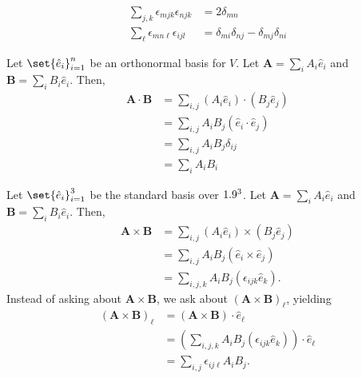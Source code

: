\documentclass[10pt]{mypackage}
\begin{document}
\begin{exercise}
  \begin{align*}
    \sum_{j,k}\epsilon_{mjk}\epsilon_{njk} &= 2\delta_{mn}\\
    \sum_{\ell}\epsilon_{mn\ell}\epsilon_{ijl} &= \delta_{mi}\delta_{nj} - \delta_{mj}\delta_{ni}
  \end{align*}
\end{exercise}
\begin{definition}
  Let $\set{\hat{e}_i}_{i=1}^{n}$ be an orthonormal basis for $V$. Let $\mathbf{A} = \sum_{i}A_i\hat{e}_i$ and $\mathbf{B} = \sum_{i}B_i\hat{e}_i$. Then,
  \begin{align*}
    \mathbf{A}\cdot \mathbf{B} &= \sum_{i,j}\left(A_i\hat{e}_i\right)\cdot\left(B_j\hat{e}_j\right)\\
                               &= \sum_{i,j}A_iB_j \left(\hat{e}_i \cdot \hat{e}_j\right)\\
                               &= \sum_{i,j}A_iB_j \delta_{ij}\\
                               &= \sum_{i}A_iB_i
  \end{align*}
\end{definition}
\begin{definition}
  Let $\set{\hat{e}_i}_{i=1}^{3}$ be the standard basis over $1.9^3$. Let $\mathbf{A} = \sum_{i}A_i\hat{e}_i$ and $\mathbf{B} = \sum_{i}B_i\hat{e}_i$. Then,
  \begin{align*}
    \mathbf{A}\times \mathbf{B} &= \sum_{i,j}\left(A_i\hat{e}_i\right)\times \left(B_j\hat{e}_j\right)\\
                                &= \sum_{i,j}A_iB_j \left(\hat{e}_i \times \hat{e}_j\right)\\
                                &= \sum_{i,j,k}A_iB_j\left(\epsilon_{ijk}\hat{e}_k\right).
  \end{align*}
  Instead of asking about $\mathbf{A}\times \mathbf{B}$, we ask about $\left(\mathbf{A}\times \mathbf{B}\right)_{\ell}$, yielding
  \begin{align*}
    \left(\mathbf{A}\times \mathbf{B}\right)_{\ell} &= \left(\mathbf{A}\times \mathbf{B}\right)\cdot \hat{e}_{\ell}\\
                                                    &= \left(\sum_{i,j,k}A_iB_j\left(\epsilon_{ijk}\hat{e}_k\right)\right)\cdot \hat{e}_{\ell}\\
                                                    &= \sum_{i,j}\epsilon_{ij\ell}A_iB_j.
  \end{align*}
\end{definition}
\end{document}
